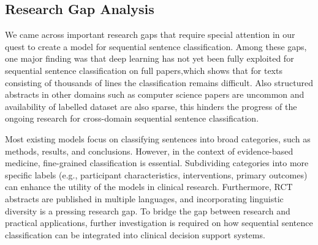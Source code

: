 \documentclass[12pt,a4paper]{report}     %
\begin{document}
\begin{normalsize}
{\begin{table}
\caption{Literature Survey}
\end{table}
\section{Research Gap Analysis}
We came across important research gaps that require special attention in our quest to create a model for sequential sentence classification. Among these gaps, one major finding was that deep learning has not yet been fully exploited for sequential sentence classification on full papers,which shows that for texts consisting of thousands of lines the classification remains difficult. Also structured abstracts in other domains such as computer science papers are uncommon and availability of labelled dataset are also sparse, this hinders the progress of the ongoing research for cross-domain sequential sentence classification.\par

Most existing models focus on classifying sentences into broad categories, such as methods, results, and conclusions. However, in the context of evidence-based medicine, fine-grained classification is essential. Subdividing categories into more specific labels (e.g., participant characteristics, interventions, primary outcomes) can enhance the utility of the models in clinical research.
Furthermore, RCT abstracts are published in multiple languages, and incorporating linguistic diversity is a pressing research gap.
To bridge the gap between research and practical applications, further investigation is required on how sequential sentence classification can be integrated into clinical decision support systems.
\par



}
\end{normalsize}
\end{document}
